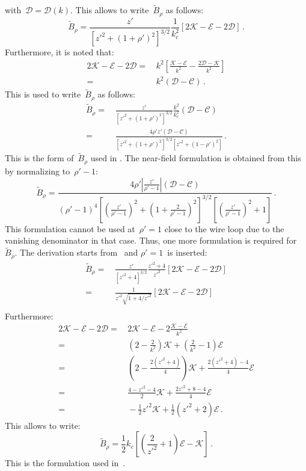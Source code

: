 with~$\mathcal{D} = \mathcal{D}(k)$.
This allows to write~$\tilde{B}_\rho$ as follows:
\begin{equation}
  \tilde{B}_\rho = \frac{z'}{\left[ z'^2 + (1 + \rho')^2 \right]^{3/2}} \frac{1}{k_c^2} \left[ 2 \mathcal{K} - \mathcal{E} - 2 \mathcal{D} \right] \, . \label{eqn:cwl_B_rho_ked}
\end{equation}
Furthermore, it is noted that:
\begin{align}
      2 \mathcal{K} - \mathcal{E} - 2 \mathcal{D}
 =&\, k^2 \left[ \frac{\mathcal{K} - \mathcal{E}}{k^2} - \frac{2 \mathcal{D} - \mathcal{K}}{k^2} \right] \nonumber \\
 =&\, k^2 \left(  \mathcal{D} - \mathcal{C} \right) \, .
\end{align}
This is used to write~$\tilde{B}_\rho$ as follows:
\begin{align}
  \tilde{B}_\rho
 =&\, \frac{z'}{\left[ z'^2 + (1 + \rho')^2 \right]^{3/2}} \frac{k^2}{k_c^2} \left(  \mathcal{D} - \mathcal{C} \right) \nonumber \\
 =&\, \frac{4 \rho' z' \left(  \mathcal{D} - \mathcal{C} \right) }{\left[ z'^2 + (1 + \rho')^2 \right]^{3/2} \left[ z'^2 + (1 - \rho')^2 \right]} \, .
\end{align}
This is the form of~$\tilde{B}_\rho$ used in .
The near-field formulation is obtained from this by normalizing to~$\rho'-1$:
\begin{equation}
  \tilde{B}_\rho
 = \frac{4 \rho' \left|\frac{z'}{\rho'-1}\right| \left( \mathcal{D} - \mathcal{C} \right) }
        {(\rho'-1)^4 \left[ \left(\frac{z'}{\rho'-1}\right)^2 + \left(1 + \frac{2}{\rho'-1}\right)^2 \right]^{3/2}
                     \left[ \left(\frac{z'}{\rho'-1}\right)^2 + 1 \right]} \, .
\end{equation}
This formulation cannot be used at~$\rho'=1$ close to the wire loop
due to the vanishing denominator in that case.
Thus, one more formulation is required for~$\tilde{B}_\rho$.
The derivation starts from~ and $\rho'=1$~is inserted:
\begin{align}
  \tilde{B}_\rho
 =&\, \frac{z'}{\left[ z'^2 + 4 \right]^{3/2}} \frac{z'^2 + 4}{z'^2} \left[ 2 \mathcal{K} - \mathcal{E} - 2 \mathcal{D} \right] \nonumber \\
 =&\, \frac{1}{z'^2 \sqrt{1 + 4/z'^2}} \left[ 2 \mathcal{K} - \mathcal{E} - 2 \mathcal{D} \right] \nonumber \\
\end{align}
Furthermore:
\begin{align}
      2 \mathcal{K} - \mathcal{E} - 2 \mathcal{D}
 =&\, 2 \mathcal{K} - \mathcal{E} - 2 \frac{\mathcal{K} - \mathcal{E}}{k^2} \nonumber \\
 =&\, \left( 2 - \frac{2}{k^2} \right) \mathcal{K} + \left( \frac{2}{k^2} - 1 \right) \mathcal{E} \nonumber \\
 =&\, \left( 2 - \frac{2(z'^2+4)}{4} \right) \mathcal{K} + \frac{2(z'^2+4) - 4}{4} \mathcal{E} \nonumber \\
 =&\, \frac{4 - z'^2 -4}{2} \mathcal{K} + \frac{2 z'^2 + 8 - 4}{4} \mathcal{E} \nonumber \\
 =&\, -\frac{1}{2} z'^2 \mathcal{K} + \frac{1}{2}\left(z'^2 +2\right) \mathcal{E} \, .
\end{align}
This allows to write:
\begin{equation}
 \tilde{B}_\rho = \frac{1}{2} k_c \left[ \left( \frac{2}{z'^2} + 1 \right) \mathcal{E} - \mathcal{K} \right] \, .
\end{equation}
This is the formulation used in~.

